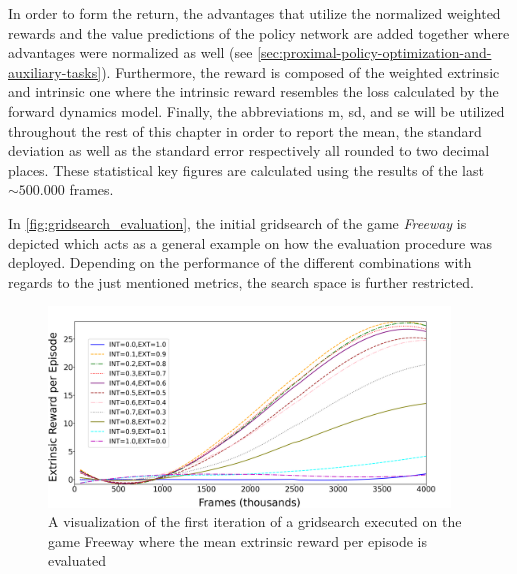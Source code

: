 \documentclass[draft,final]{vutinfth} %
\begin{document}
    In order to form the return, the advantages that utilize the normalized weighted rewards and the value predictions of the policy network are added together where advantages were normalized as well (see \autoref{sec:proximal-policy-optimization-and-auxiliary-tasks}).
    Furthermore, the reward is composed of the weighted extrinsic and intrinsic one where the intrinsic reward resembles the loss calculated by the forward dynamics model.
    Finally, the abbreviations \acrshort{m}, \acrshort{sd}, and \acrshort{se} will be utilized throughout the rest of this chapter in order to report the mean, the standard deviation as well as the standard error respectively all rounded to two decimal places.
    These statistical key figures are calculated using the results of the last $\sim500.000$ frames.

    In \autoref{fig:gridsearch_evaluation}, the initial gridsearch of the game \textit{Freeway} is depicted which acts as a general example on how the evaluation procedure was deployed.
    Depending on the performance of the different combinations with regards to the just mentioned metrics, the search space is further restricted.

    \begin{figure}[h]
        \centering
        \includegraphics[width=0.95\textwidth]{figures/example_grid_search.png}
        \caption[A visualization of the first iteration of an executed gridsearch for the game Freeway]{A visualization of the first iteration of a gridsearch executed on the game Freeway where the mean extrinsic reward per episode is evaluated}
        \label{fig:gridsearch_evaluation}
    \end{figure}
\end{document}
